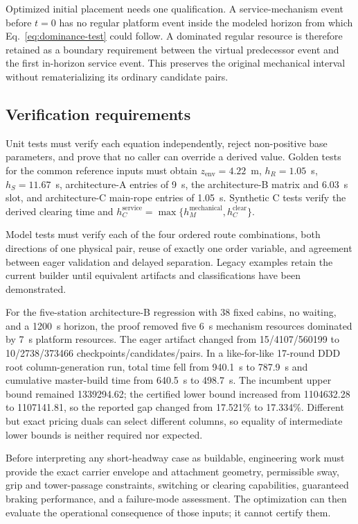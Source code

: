 \documentclass[11pt,a4paper]{scrartcl}
\begin{document}
Optimized initial placement needs one qualification.  A service-mechanism
event before $t=0$ has no regular platform event inside the modeled horizon
from which Eq.~\eqref{eq:dominance-test} could follow.  A dominated regular
resource is therefore retained as a boundary requirement between the virtual
predecessor event and the first in-horizon service event.  This preserves the
original mechanical interval without rematerializing its ordinary candidate
pairs.

\subsection{Verification requirements}

Unit tests must verify each equation independently, reject non-positive base
parameters, and prove that no caller can override a derived value.  Golden
tests for the common reference inputs must obtain
$z_{\mathrm{env}}=4.22$~m, $h_R=1.05$~s,
$h_S=11.67$~s, architecture-A entries of 9~s, the architecture-B matrix and
6.03~s slot, and architecture-C main-rope entries of 1.05~s.  Synthetic C
tests verify the derived clearing time and
$h_C^{\mathrm{service}}=\max\{h_M^{\mathrm{mechanical}},h_C^{\mathrm{clear}}\}$.

Model tests must verify each of the four ordered route combinations, both
directions of one physical pair, reuse of exactly one order variable, and
agreement between eager validation and delayed separation.  Legacy examples
retain the current builder until equivalent artifacts and classifications have
been demonstrated.

For the five-station architecture-B regression with 38 fixed cabins, no
waiting, and a 1200~s horizon, the proof removed five 6~s mechanism resources
dominated by 7~s platform resources.  The eager artifact changed from
15/4107/560199 to 10/2738/373466
checkpoints/candidates/pairs.  In a like-for-like 17-round DDD root
column-generation run, total time fell from 940.1~s to 787.9~s and cumulative
master-build time from 640.5~s to 498.7~s.  The incumbent upper bound remained
1339294.62; the certified lower bound increased from 1104632.28 to 1107141.81,
so the reported gap changed from 17.521\% to 17.334\%.  Different but exact
pricing duals can select different columns, so equality of intermediate lower
bounds is neither required nor expected.

Before interpreting any short-headway case as buildable, engineering work must
provide the exact carrier envelope and attachment geometry, permissible sway,
grip and tower-passage constraints, switching or clearing capabilities,
guaranteed braking performance, and a failure-mode assessment.
The optimization can then evaluate the operational consequence of those inputs;
it cannot certify them.

\printbibliography
\end{document}
